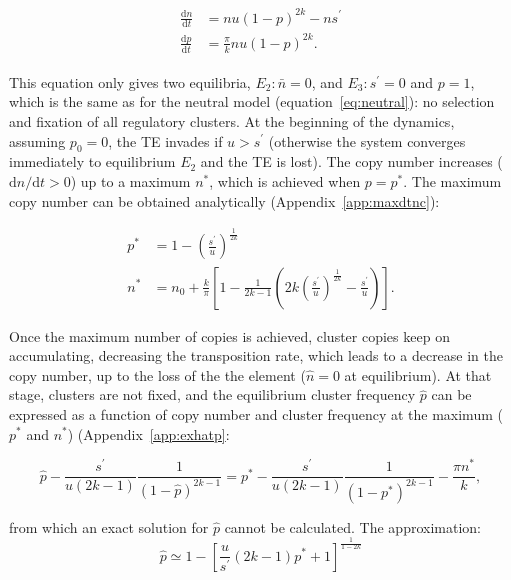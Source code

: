 \documentclass[10pt,a4paper]{article}
\begin{document}
\begin{align}\label{eq:dtnc}
\begin{split}
\frac{\mathrm d n}{\mathrm d t} &= n u (1-p)^{2k} - n s^\prime \\
\frac{\mathrm d p}{\mathrm d t} &= \frac{\pi}{k} n u (1-p)^{2k}.
\end{split}
\end{align}

This equation only gives two equilibria, $E_2: \bar n = 0$, and $E_3: s^\prime=0$ and $p=1$, which is the same as for the neutral model (equation~\ref{eq:neutral}): no selection and fixation of all regulatory clusters. At the beginning of the dynamics, assuming $p_0 = 0$, the TE invades if $u > s^\prime$ (otherwise the system converges immediately to equilibrium $E_2$ and the TE is lost). The copy number increases ($\mathrm d n/\mathrm d t > 0$) up to a maximum $n^\ast$, which is achieved when $p=p^\ast$. The maximum copy number can be obtained analytically (Appendix~\ref{app:maxdtnc}):

\begin{equation}\label{eq:maxdtnc}
\begin{split}
	p^\ast &= 1-\left(\frac{s^\prime}{u}\right)^\frac{1}{2k} \\
	n^\ast &= n_0 + \frac{k}{\pi}\left[ 1- \frac{1}{2k-1} \left(2k\left(\frac{s^\prime}{u}\right)^\frac{1}{2k} - \frac{s^\prime}{u}\right) \right].
\end{split}  
\end{equation}

Once the maximum number of copies is achieved, cluster copies keep on accumulating, decreasing the transposition rate, which leads to a decrease in the copy number, up to the loss of the the element ($\hat n = 0$ at equilibrium). At that stage, clusters are not fixed, and the equilibrium cluster frequency $\hat p$ can be expressed as a function of copy number and cluster frequency at the maximum ($p^\ast$ and $n^\ast$) (Appendix~\ref{app:exhatp}:

\begin{equation}\label{eq:exhatp}
	\hat{p} - \frac{s^\prime}{u(2k-1)}\frac{1}{(1-\hat p)^{2k-1}} = p^\ast - \frac{s^\prime}{u(2k-1)}\frac{1}{(1-p^\ast)^{2k-1}} - \frac{\pi n^\ast}{k},
\end{equation}

\noindent from which an exact solution for $\hat p$ cannot be calculated. The approximation:
\begin{equation}\label{eq:approxhatp}
	\hat p \simeq 1-\left[\frac{u}{s^\prime}(2k-1)p^\ast +1\right]^\frac{1}{1-2k}
\end{equation}
\end{document}

